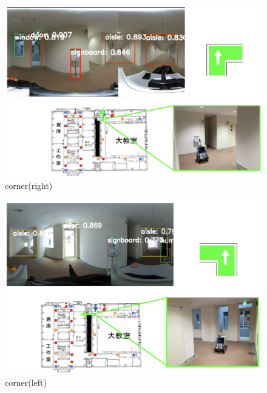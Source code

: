 \documentclass[../main]{subfiles}
\begin{document}
        \begin{figure} [H]
            \centering
            \includegraphics[scale=0.5]{../images/experiment_corner_right.png}
            \caption{corner(right)}
            \label{figure::corner_right}
        \end{figure}

        \begin{figure}[H]
            \centering
            \includegraphics[scale=0.5]{../images/experiment_corner_left.png}
            \caption{corner(left)}
            \label{figure::corner_left}
        \end{figure}  

\end{document}
